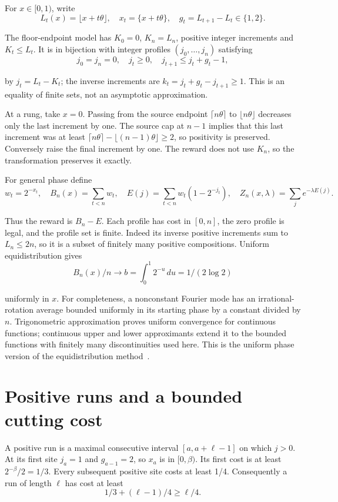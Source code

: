 \documentclass[11pt,letterpaper]{article}
\begin{document}
For $x\in[0,1)$, write
\[
L_t(x)=\lfloor x+t\theta\rfloor,\quad
x_t=\{x+t\theta\},\quad g_t=L_{t+1}-L_t\in\{1,2\}.
\]

The floor-endpoint model has $K_0=0$, $K_n=L_n$, positive integer increments and $K_t\le L_t$. It is in bijection with integer profiles $(j_0,\ldots,j_n)$ satisfying
\[
j_0=j_n=0,\quad j_t\ge0,\quad
j_{t+1}\le j_t+g_t-1,
\]

by $j_t=L_t-K_t$; the inverse increments are $k_t=j_t+g_t-j_{t+1}\ge1$. This is an equality of finite sets, not an asymptotic approximation.

At a rung, take $x=0$. Passing from the source endpoint $\lceil n\theta\rceil$ to $\lfloor n\theta\rfloor$ decreases only the last increment by one. The source cap at $n-1$ implies that this last increment was at least $\lceil n\theta\rceil-\lfloor(n-1)\theta\rfloor\ge2$, so positivity is preserved. Conversely raise the final increment by one. The reward does not use $K_n$, so the transformation preserves it exactly.

For general phase define
\[
w_t=2^{-x_t},\quad B_n(x)=\sum_{t<n}w_t,\quad
E(j)=\sum_{t<n}w_t(1-2^{-j_t}),\quad
Z_n(x,\lambda)=\sum_j e^{-\lambda E(j)}.
\]

Thus the reward is $B_n-E$. Each profile has cost in $[0,n]$, the zero profile is legal, and the profile set is finite. Indeed its inverse positive increments sum to $L_n\le2n$, so it is a subset of finitely many positive compositions. Uniform equidistribution gives
\[
B_n(x)/n\longrightarrow b=\int_0^1 2^{-u}\,du=1/(2\log2)
\]

uniformly in $x$. For completeness, a nonconstant Fourier mode has an irrational-rotation average bounded uniformly in its starting phase by a constant divided by $n$. Trigonometric approximation proves uniform convergence for continuous functions; continuous upper and lower approximants extend it to the bounded functions with finitely many discontinuities used here. This is the uniform phase version of the equidistribution method~\cite{weyl}.

\section{Positive runs and a bounded cutting cost}

A positive run is a maximal consecutive interval $[a,a+\ell-1]$ on which $j>0$. At its first site $j_a=1$ and $g_{a-1}=2$, so $x_a$ is in $[0,\beta)$. Its first cost is at least $2^{-\beta}/2=1/3$. Every subsequent positive site costs at least 1/4. Consequently a run of length $\ell$ has cost at least
\[
1/3+(\ell-1)/4\ge\ell/4.
\]
\end{document}
